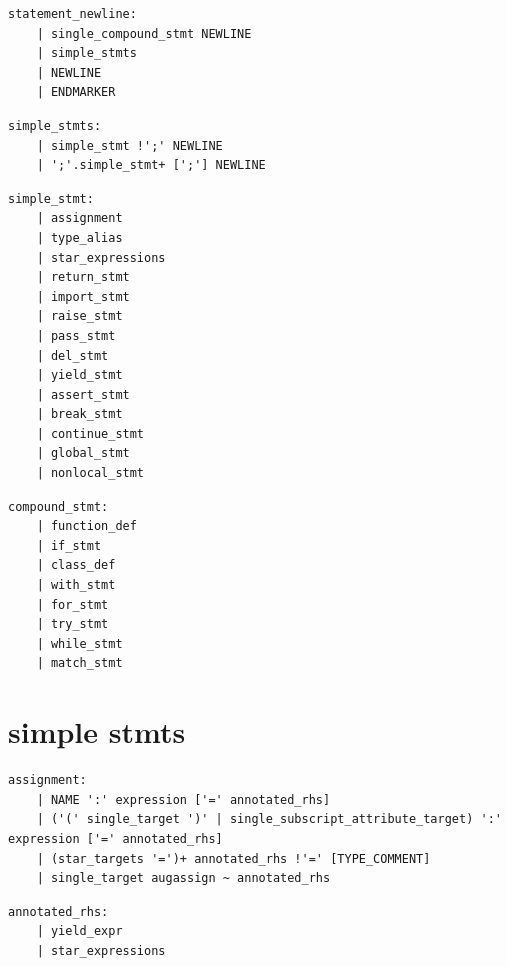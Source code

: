 \noindent\textbf{\texttt{}}\par
\begin{lstlisting}
statement_newline:
    | single_compound_stmt NEWLINE
    | simple_stmts
    | NEWLINE
    | ENDMARKER
\end{lstlisting}

\noindent\textbf{\texttt{}}\par
\begin{lstlisting}
simple_stmts:
    | simple_stmt !';' NEWLINE
    | ';'.simple_stmt+ [';'] NEWLINE
\end{lstlisting}

\noindent\textbf{\texttt{}}\par
\begin{lstlisting}
simple_stmt:
    | assignment
    | type_alias
    | star_expressions
    | return_stmt
    | import_stmt
    | raise_stmt
    | pass_stmt
    | del_stmt
    | yield_stmt
    | assert_stmt
    | break_stmt
    | continue_stmt
    | global_stmt
    | nonlocal_stmt
\end{lstlisting}

\noindent\textbf{\texttt{}}\par
\begin{lstlisting}
compound_stmt:
    | function_def
    | if_stmt
    | class_def
    | with_stmt
    | for_stmt
    | try_stmt
    | while_stmt
    | match_stmt
\end{lstlisting}

\section{simple stmts}

\noindent\textbf{\texttt{}}\par
\begin{lstlisting}
assignment:
    | NAME ':' expression ['=' annotated_rhs]
    | ('(' single_target ')' | single_subscript_attribute_target) ':' expression ['=' annotated_rhs]
    | (star_targets '=')+ annotated_rhs !'=' [TYPE_COMMENT]
    | single_target augassign ~ annotated_rhs
\end{lstlisting}

\noindent\textbf{\texttt{}}\par
\begin{lstlisting}
annotated_rhs:
    | yield_expr
    | star_expressions
\end{lstlisting}

